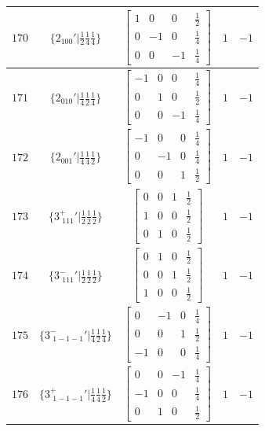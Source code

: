 \documentclass[fleqn,8pt]{jsarticle}
\begin{document}
\begin{longtable}{ccccc}
$ 170 $ & $ \{2{}_{100}{}'|\frac{1}{2} \frac{1}{4} \frac{1}{4}\} $ & $ \begin{bmatrix} 1 & 0 & 0 & \frac{1}{2} \\ 0 & -1 & 0 & \frac{1}{4} \\ 0 & 0 & -1 & \frac{1}{4} \end{bmatrix} $ & $ 1 $ & $ -1 $ \\ \hline
$ 171 $ & $ \{2{}_{010}{}'|\frac{1}{4} \frac{1}{2} \frac{1}{4}\} $ & $ \begin{bmatrix} -1 & 0 & 0 & \frac{1}{4} \\ 0 & 1 & 0 & \frac{1}{2} \\ 0 & 0 & -1 & \frac{1}{4} \end{bmatrix} $ & $ 1 $ & $ -1 $ \\ \hline
$ 172 $ & $ \{2{}_{001}{}'|\frac{1}{4} \frac{1}{4} \frac{1}{2}\} $ & $ \begin{bmatrix} -1 & 0 & 0 & \frac{1}{4} \\ 0 & -1 & 0 & \frac{1}{4} \\ 0 & 0 & 1 & \frac{1}{2} \end{bmatrix} $ & $ 1 $ & $ -1 $ \\ \hline
$ 173 $ & $ \{3^{+}_{\,\,111}{}'|\frac{1}{2} \frac{1}{2} \frac{1}{2}\} $ & $ \begin{bmatrix} 0 & 0 & 1 & \frac{1}{2} \\ 1 & 0 & 0 & \frac{1}{2} \\ 0 & 1 & 0 & \frac{1}{2} \end{bmatrix} $ & $ 1 $ & $ -1 $ \\ \hline
$ 174 $ & $ \{3^{-}_{\,\,111}{}'|\frac{1}{2} \frac{1}{2} \frac{1}{2}\} $ & $ \begin{bmatrix} 0 & 1 & 0 & \frac{1}{2} \\ 0 & 0 & 1 & \frac{1}{2} \\ 1 & 0 & 0 & \frac{1}{2} \end{bmatrix} $ & $ 1 $ & $ -1 $ \\ \hline
$ 175 $ & $ \{3^{-}_{\,\,1-1-1}{}'|\frac{1}{4} \frac{1}{2} \frac{1}{4}\} $ & $ \begin{bmatrix} 0 & -1 & 0 & \frac{1}{4} \\ 0 & 0 & 1 & \frac{1}{2} \\ -1 & 0 & 0 & \frac{1}{4} \end{bmatrix} $ & $ 1 $ & $ -1 $ \\ \hline
$ 176 $ & $ \{3^{+}_{\,\,1-1-1}{}'|\frac{1}{4} \frac{1}{4} \frac{1}{2}\} $ & $ \begin{bmatrix} 0 & 0 & -1 & \frac{1}{4} \\ -1 & 0 & 0 & \frac{1}{4} \\ 0 & 1 & 0 & \frac{1}{2} \end{bmatrix} $ & $ 1 $ & $ -1 $ \\ \hline

\end{longtable}
\end{document}
